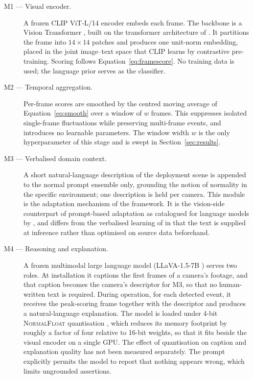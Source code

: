 \documentclass[a4paper,fleqn]{cas-sc}
\begin{document}
\begin{description}
  \item[M1 --- Visual encoder.] A frozen CLIP ViT-L/14 encoder
  \citep{radford2021clip} embeds each frame. The backbone is a Vision
  Transformer \citep{dosovitskiy2021vit}, built on the transformer architecture
  of \citet{vaswani2017attention}. It partitions the frame into
  $14 \times 14$ patches and produces one unit-norm embedding, placed in the
  joint image--text space that CLIP learns by contrastive pre-training. Scoring
  follows Equation~\eqref{eq:framescore}. No training data is used; the
  language prior serves as the classifier.

  \item[M2 --- Temporal aggregation.] Per-frame scores are smoothed by the
  centred moving average of Equation~\eqref{eq:smooth} over a window of $w$
  frames. This suppresses isolated single-frame fluctuations while preserving
  multi-frame events, and introduces no learnable parameters. The window width
  $w$ is the only hyperparameter of this stage and is swept in
  Section~\ref{sec:results}.

  \item[M3 --- Verbalised domain context.] A short natural-language description
  of the deployment scene is appended to the normal prompt ensemble only,
  grounding the notion of normality in the specific environment; one
  description is held per camera. This module is the adaptation
  mechanism of the framework. It is the vision-side counterpart of prompt-based
  adaptation as catalogued for language models by \citet{fan2026llm}, and
  differs from the verbalised learning of \citet{ye2025vera} in that the text is
  supplied at inference rather than optimised on source data beforehand.

  \item[M4 --- Reasoning and explanation.] A frozen multimodal large language
  model (LLaVA-1.5-7B \citep{liu2023llava}) serves two roles. At installation it
  captions the first frames of a camera's footage, and that caption becomes the
  camera's descriptor for M3, so that no human-written text is required. During
  operation, for each detected event, it receives the peak-scoring frame
  together with the descriptor and produces a natural-language explanation.
  The model is loaded under 4-bit
  \textsc{NormalFloat} quantisation \citep{dettmers2023qlora}, which reduces its
  memory footprint by roughly a factor of four relative to 16-bit weights, so
  that it fits beside the visual encoder on a single GPU. The effect of
  quantisation on caption and explanation quality has not been measured
  separately. The prompt explicitly permits the model to report that nothing
  appears wrong, which limits ungrounded assertions.
\end{description}
\end{document}
